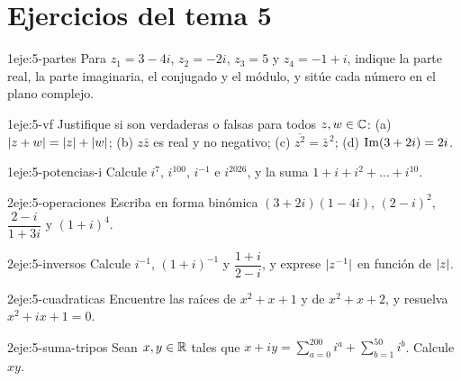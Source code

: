 \section*{Ejercicios del tema 5}

\begin{ejercicio}{1}{eje:5-partes}
Para $z_1=3-4i$, $z_2=-2i$, $z_3=5$ y $z_4=-1+i$, indique la parte real, la parte imaginaria, el conjugado y el módulo, y sitúe cada número en el plano complejo.
\end{ejercicio}

\begin{ejercicio}{1}{eje:5-vf}
Justifique si son verdaderas o falsas para todos $z,w\in\mathbb{C}$: (a) $\lvert z+w\rvert=\lvert z\rvert+\lvert w\rvert$; (b) $z\bar z$ es real y no negativo; (c) $\overline{z^{2}}=\bar z^{\,2}$; (d) $\operatorname{Im}(3+2i)=2i$.
\end{ejercicio}

\begin{ejercicio}{1}{eje:5-potencias-i}
Calcule $i^{7}$, $i^{100}$, $i^{-1}$ e $i^{2026}$, y la suma $1+i+i^{2}+\dots+i^{10}$.
\end{ejercicio}

\begin{ejercicio}{2}{eje:5-operaciones}
Escriba en forma binómica $(3+2i)(1-4i)$, $(2-i)^{2}$, $\dfrac{2-i}{1+3i}$ y $(1+i)^{4}$.
\end{ejercicio}

\begin{ejercicio}{2}{eje:5-inversos}
Calcule $i^{-1}$, $(1+i)^{-1}$ y $\dfrac{1+i}{2-i}$, y exprese $\lvert z^{-1}\rvert$ en función de $\lvert z\rvert$.
\end{ejercicio}

\begin{ejercicio}{2}{eje:5-cuadraticas}
Encuentre las raíces de $x^{2}+x+1$ y de $x^{2}+x+2$, y resuelva $x^{2}+ix+1=0$.
\end{ejercicio}

\begin{ejercicio}{2}{eje:5-suma-tripos}
Sean $x,y\in\mathbb{R}$ tales que $x+iy=\sum_{a=0}^{200}i^{a}+\sum_{b=1}^{50}i^{b}$. Calcule $xy$.
\end{ejercicio}

